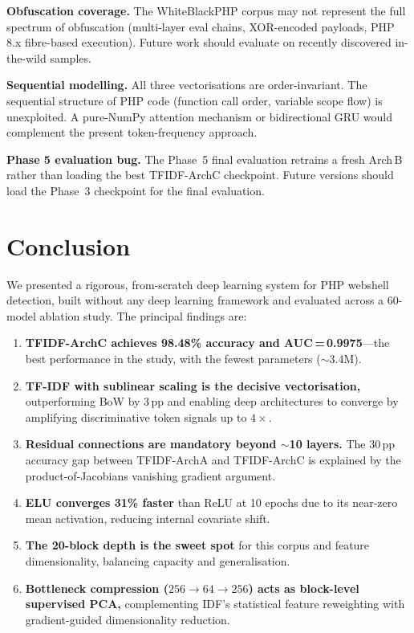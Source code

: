 \documentclass[10pt,conference,letterpaper]{IEEEtran}
\begin{document}
\textbf{Obfuscation coverage.} The WhiteBlackPHP corpus may not represent the
full spectrum of obfuscation (multi-layer eval chains, XOR-encoded payloads,
PHP 8.x fibre-based execution). Future work should evaluate on recently discovered
in-the-wild samples.

\textbf{Sequential modelling.} All three vectorisations are order-invariant.
The sequential structure of PHP code (function call order, variable scope flow)
is unexploited. A pure-NumPy attention mechanism or bidirectional GRU would
complement the present token-frequency approach.

\textbf{Phase 5 evaluation bug.} The Phase~5 final evaluation retrains a fresh
Arch\,B rather than loading the best TFIDF-ArchC checkpoint. Future versions
should load the Phase~3 checkpoint for the final evaluation.

\section{Conclusion}
\label{sec:conc}

We presented a rigorous, from-scratch deep learning system for PHP webshell
detection, built without any deep learning framework and evaluated across a
60-model ablation study. The principal findings are:

\begin{enumerate}
  \item \textbf{TFIDF-ArchC achieves 98.48\% accuracy and AUC\,=\,0.9975}---the
        best performance in the study, with the fewest parameters ($\sim$3.4M).
  \item \textbf{TF-IDF with sublinear scaling is the decisive vectorisation,}
        outperforming BoW by 3\,pp and enabling deep architectures to converge
        by amplifying discriminative token signals up to $4\times$.
  \item \textbf{Residual connections are mandatory beyond $\sim$10 layers.}
        The 30\,pp accuracy gap between TFIDF-ArchA and TFIDF-ArchC is
        explained by the product-of-Jacobians vanishing gradient argument.
  \item \textbf{ELU converges 31\% faster} than ReLU at 10 epochs due to its
        near-zero mean activation, reducing internal covariate shift.
  \item \textbf{The 20-block depth is the sweet spot} for this corpus and
        feature dimensionality, balancing capacity and generalisation.
  \item \textbf{Bottleneck compression ($256\to64\to256$) acts as block-level
        supervised PCA,} complementing IDF's statistical feature reweighting
        with gradient-guided dimensionality reduction.
\end{enumerate}
\end{document}
